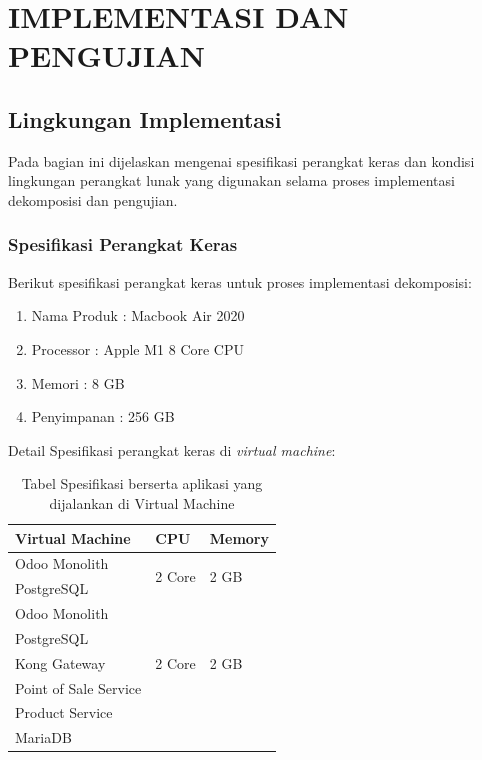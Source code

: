 \chapter{IMPLEMENTASI DAN PENGUJIAN}

\vspace{4.5pt}

\section{Lingkungan Implementasi}
Pada bagian ini dijelaskan mengenai spesifikasi perangkat keras dan kondisi lingkungan perangkat lunak yang digunakan selama proses implementasi dekomposisi dan pengujian.\\

\subsection{Spesifikasi Perangkat Keras}
Berikut spesifikasi perangkat keras untuk proses implementasi dekomposisi:

\begin{enumerate}[leftmargin=1.3cm]
	\item Nama Produk : Macbook Air 2020 
	\item Processor : Apple M1 8 Core CPU
	\item Memori : 8 GB
	\item Penyimpanan : 256 GB 
\end{enumerate}
Detail Spesifikasi perangkat keras di \textit{virtual machine}: 

\begingroup
\setlength{\LTleft}{-20cm plus -1fill}
\setlength{\LTright}{\LTleft}
\begin{small}
	\begin{longtable}{|p{6.5cm}|p{3cm}|p{3cm}|}
		\caption{Tabel Spesifikasi berserta aplikasi yang dijalankan di Virtual Machine}\\
		\hline
		\textbf{Virtual Machine} & \textbf{CPU} & \textbf{Memory}\\
		\endfirsthead

		\hline
		Odoo Monolith &  \multirow{2}{*}{2 Core}  & \multirow{2}{*}{2 GB} \\
		\cline{1-1}
		 	PostgreSQL &  & \\
		\hline
		Odoo Monolith &  \multirow{5}{*}{2 Core}  & \multirow{5}{*}{2 GB} \\
		\cline{1-1}
		 	PostgreSQL &  & \\
		\cline{1-1}
			Kong Gateway &  &\\
		\cline{1-1}
			Point of Sale Service &  &\\
		\cline{1-1}
			Product Service &  &\\
		\cline{1-1}
			MariaDB &  &\\
		\hline
	\end{longtable}
\end{small}
\endgroup


